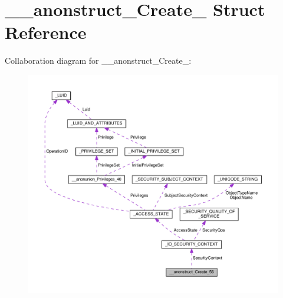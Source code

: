 \hypertarget{struct____anonstruct__Create__56}{}\section{\+\_\+\+\_\+anonstruct\+\_\+\+Create\+\_ Struct Reference}
\label{struct____anonstruct__Create__56}


Collaboration diagram for \+\_\+\+\_\+anonstruct\+\_\+\+Create\+\_\+:
\nopagebreak
\begin{figure}[H]
\begin{center}
\leavevmode
\includegraphics[width=350pt]{struct____anonstruct__Create__56__coll__graph}
\end{center}
\end{figure}
